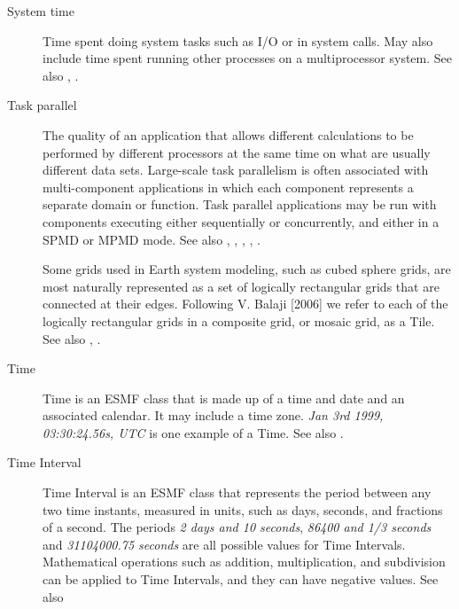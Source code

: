 \begin{description}
\label{glos:SysTime} 
\item [System time] 
  Time spent doing system tasks 
  such as I/O or in system calls.  May also include time spent running 
  other processes on a multiprocessor system. See also , .

\label{glos:TaskParallel}  
\item[Task parallel] 
  The quality of an application that allows
  different calculations to be performed by different processors at the same 
  time on what are usually different data sets.  Large-scale task parallelism 
  is often associated with multi-component applications in which each component
  represents a separate domain or function.  Task parallel applications 
  may be run with components executing either sequentially or concurrently, 
  and either in a SPMD or MPMD mode. See also 
  , 
  , , 
  , 
  .

\label{glos:GridTile}
  Some grids used in Earth system modeling, such as cubed sphere grids, are
  most naturally represented
  as a set of logically rectangular grids that are connected at their 
  edges.  Following V. Balaji [2006] we refer to each of the 
  logically rectangular grids in a composite grid, or mosaic grid, as a
  Tile.  See also , 
  .

\label{glos:TimeInstant}
\item [Time] 
  Time is an ESMF class that is made up of a time and date and an 
  associated calendar. It may include a time zone.
  \emph{Jan 3rd 1999, 03:30:24.56s, UTC} is one example of a Time.
  See also .

\label{glos:TimeInterval} 
\item [Time Interval] 
  Time Interval is an ESMF class that represents the
  period between any two time instants, measured in units, such as days, 
  seconds, and fractions of a second.  The periods \emph{2 days and 10 seconds}, 
  \emph{86400 and 1/3 seconds} and \emph{31104000.75 seconds} are all 
  possible values for Time Intervals.  
  Mathematical operations such as addition, multiplication, and subdivision 
  can be applied to Time Intervals, and they can have negative values. 
  See also 


\end{description}
